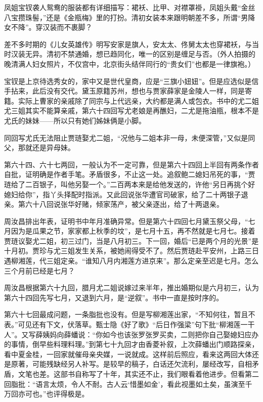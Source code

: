 \par 凤姐宝钗袭人鸳鸯的服装都有详细描写：裙袄、比甲、对襟罩褂，凤姐头戴“金丝八宝攒珠髻，”还是《金瓶梅》里的打扮。清初女装本来跟明朝差不多，所谓“男降女不降”。穿汉装而不裹脚？
\par 差不多时期的《儿女英雄传》明写安家是旗人，安太太、佟舅太太也穿裙袄，与当时汉装无异。清初不禁通婚，想已趋同化，唯一的区别是缠足与否。（外人拍摄的晚清满人妇女照片，不仅宫中，北京街头结伴同行的“贵女们”也都是一律旗袍。）
\par 宝钗是上京待选秀女的，家中又是世代皇商，应是“三旗小妞妞”。但是应选似是信手拈来，此后没有交代。黛玉原籍苏州，想也与贾家薛家是金陵人一样，同是寄籍。实际上曹家的亲戚除了同宗与上代远亲，大约都是满人或包衣。书中的尤二姐尤三姐其实不能算亲戚，第六十四回写尤老娘是再醮妇，二尤是拖油瓶，根本不是尤氏的妹妹——所以只有她们姊妹俩是小脚。
\par 同回写尤氏无法阻止贾琏娶尤二姐，“况他与二姐本非一母，未便深管，”又似是同父，那就还是异母妹。
\par 第六十四、六十七两回，一般认为不一定可靠，但是第六十四回上半回有两条作者自批，证明确是作者手笔。矛盾很多，不止这一处。追叙鲍二媳妇吊死的事，“贾琏给了二百银子，叫他另娶一个。”二百两本来是给他发送的，许他“另日再挑个好媳妇给你”，指丫头择配时指派。又此回说张华遭官司破家，给了二十两银子退亲。第六十八回说张华好赌，倾家荡产，被父亲逐出，给了十两退亲。
\par 周汝昌排出年表，证明书中年月准确异常。但是第六十四回七月黛玉祭父母，“七月因为是瓜果之节，家家都上秋季的坟”，是七月十五，再不然就是七月七。接着贾琏议娶尤二姐，初三过门，当是八月初三。下一回，婚后“已是两个月的光景”是十月初。贾珍与尤三姐发生关系，被她闹得受不了。然后贾琏赴平安州，上路三日遇柳湘莲，代三姐定亲。“谁知八月内湘莲方进京来”。那么定亲至迟是七月。怎么三个月前已经是七月？
\par 周汝昌根据第六十九回，腊月尤二姐说嫁过来半年，推出婚期似是六月初三，认为第六十四回先写七月，又退到六月，是“逆叙”。书中一直是按时序的。
\par 第六十七回最成问题，一条脂批也没有。但是写柳湘莲出家，“不知何往，暂且不表。”可见还有下文，伏落草。甄士隐《好了歌》“后日作强梁”句下批“柳湘莲一干人”。又写薛姨妈向薛蟠说：“你如今也该张罗张罗买卖，二则把你自己娶媳妇应办的事情，倒早些料理料理。”到第七十九回才由香菱补叙，上次薛蟠出门顺路探亲，看中夏金桂，一回家就催母亲央媒，一说就成。这样前后照应，看来这两回大体还是原著，可能残缺经另人补写。是较早的稿子，白话还欠流利，屡经改写，自相矛盾，文笔也差。这部书自称写了十年，其实还不止，我们眼看着他进步。但看第二回脂批：“语言太烦，令人不耐。古人云‘惜墨如金’，看此视墨如土矣，虽演至千万回亦可也。”也评得极是。
